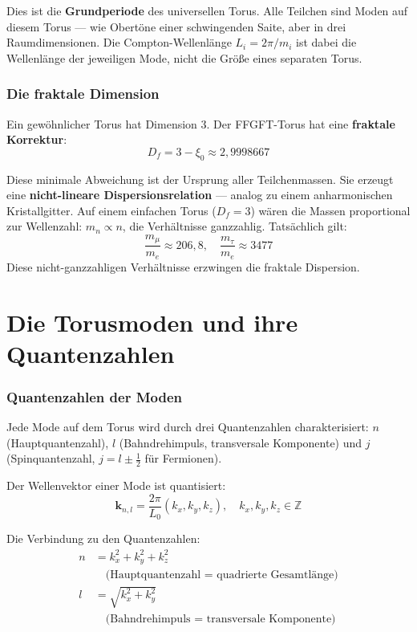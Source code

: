 Dies ist die \textbf{Grundperiode} des universellen Torus. Alle Teilchen
sind Moden auf diesem Torus — wie Obertöne einer schwingenden Saite,
aber in drei Raumdimensionen. Die Compton-Wellenlänge $L_i = 2\pi/m_i$
ist dabei die Wellenlänge der jeweiligen Mode, nicht die Größe eines
separaten Torus.

\section{Die fraktale Dimension}

Ein gewöhnlicher Torus hat Dimension 3. Der FFGFT-Torus hat eine
\textbf{fraktale Korrektur}:
\begin{equation}
  D_f = 3 - \xi_0 \approx 2{,}9998667
\end{equation}

Diese minimale Abweichung ist der Ursprung aller Teilchenmassen.
Sie erzeugt eine \textbf{nicht-lineare Dispersionsrelation} — analog
zu einem anharmonischen Kristallgitter. Auf einem einfachen Torus
($D_f = 3$) wären die Massen proportional zur Wellenzahl:
$m_n \propto n$, die Verhältnisse ganzzahlig. Tatsächlich gilt:
\[
  \frac{m_\mu}{m_e} \approx 206{,}8, \quad
  \frac{m_\tau}{m_e} \approx 3477
\]
Diese nicht-ganzzahligen Verhältnisse erzwingen die fraktale Dispersion.

\part{Die Torusmoden und ihre Quantenzahlen}

\section{Quantenzahlen der Moden}

Jede Mode auf dem Torus wird durch drei Quantenzahlen charakterisiert:
$n$ (Hauptquantenzahl), $l$ (Bahndrehimpuls, transversale Komponente)
und $j$ (Spinquantenzahl, $j = l \pm \tfrac{1}{2}$ für Fermionen).

Der Wellenvektor einer Mode ist quantisiert:
\begin{equation}
  \mathbf{k}_{n,l} = \frac{2\pi}{L_0}(k_x, k_y, k_z),
  \quad k_x, k_y, k_z \in \mathbb{Z}
\end{equation}

Die Verbindung zu den Quantenzahlen:
\begin{align}
  n &= k_x^2 + k_y^2 + k_z^2 \\
  &\quad\text{(Hauptquantenzahl = quadrierte Gesamtlänge)} \nonumber \\
  l &= \sqrt{k_x^2 + k_y^2} \\
  &\quad\text{(Bahndrehimpuls = transversale Komponente)} \nonumber
\end{align}

